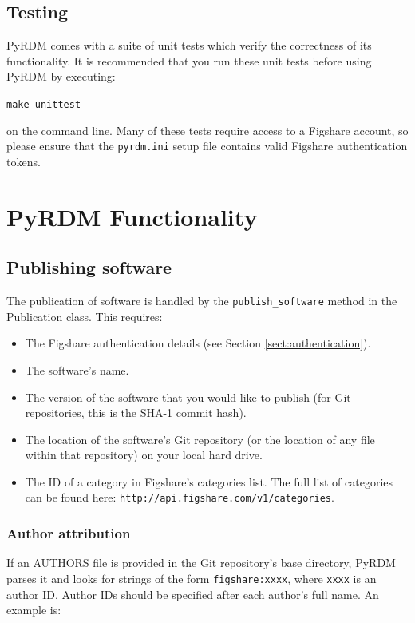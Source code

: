 \documentclass[a4paper,11pt]{report}
\begin{document}
\section{Testing}
PyRDM comes with a suite of unit tests which verify the correctness of its functionality. It is recommended that you run these unit tests before using PyRDM by executing:

  \texttt{make unittest}
  
on the command line. Many of these tests require access to a Figshare account, so please ensure that the \texttt{pyrdm.ini} setup file contains valid Figshare authentication tokens.

\chapter{PyRDM Functionality}

\section{Publishing software}
The publication of software is handled by the \texttt{publish\_software} method in the Publication class. This requires:

\begin{itemize}
  \item The Figshare authentication details (see Section \ref{sect:authentication}).
  \item The software's name.
  \item The version of the software that you would like to publish (for Git repositories, this is the SHA-1 commit hash).
  \item The location of the software's Git repository (or the location of any file within that repository) on your local hard drive.
  \item The ID of a category in Figshare's categories list. The full list of categories can be found here: \texttt{http://api.figshare.com/v1/categories}.
\end{itemize}

\subsection{Author attribution}
If an AUTHORS file is provided in the Git repository's base directory, PyRDM parses it and looks for strings of the form \texttt{figshare:xxxx}, where \texttt{xxxx} is an author ID. Author IDs should be specified after each author's full name. An example is: 
\end{document}

